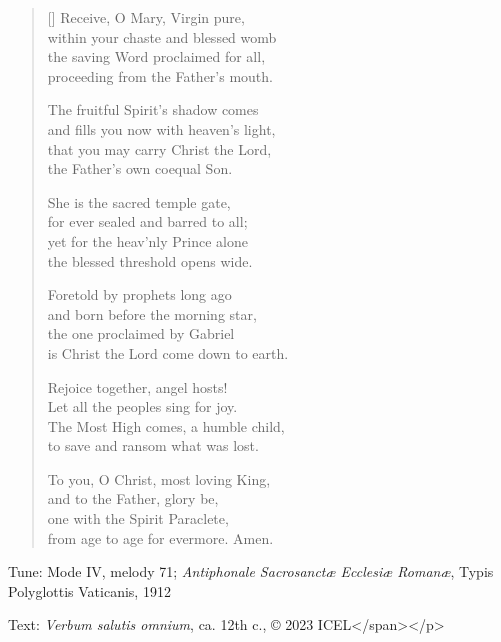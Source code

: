 \hymn

\settowidth{\versewidth}{and fills you now with heaven’s light,}

\begin{verse}[\versewidth]
Receive, O Mary, Virgin pure,\\
within your chaste and blessed womb\\
the saving Word proclaimed for all,\\
proceeding from the Father’s mouth.

The fruitful Spirit’s shadow comes\\
and fills you now with heaven’s light,\\
that you may carry Christ the Lord,\\
the Father’s own coequal Son.

She is the sacred temple gate,\\
for ever sealed and barred to all;\\
yet for the heav’nly Prince alone\\
the blessed threshold opens wide.

Foretold by prophets long ago\\
and born before the morning star,\\
the one proclaimed by Gabriel\\
is Christ the Lord come down to earth.

Rejoice together, angel hosts!\\
Let all the peoples sing for joy.\\
The Most High comes, a humble child,\\
to save and ransom what was lost.

To you, O Christ, most loving King,\\
and to the Father, glory be,\\
one with the Spirit Paraclete,\\
from age to age for evermore. Amen.
\end{verse}

\begin{hymnsource}
Tune: Mode IV, melody 71; \emph{Antiphonale Sacrosanctæ Ecclesiæ Romanæ}, Typis Polyglottis Vaticanis, 1912

Text: \emph{Verbum salutis omnium}, ca. 12th c., © 2023 ICEL</span></p>

\end{hymnsource}